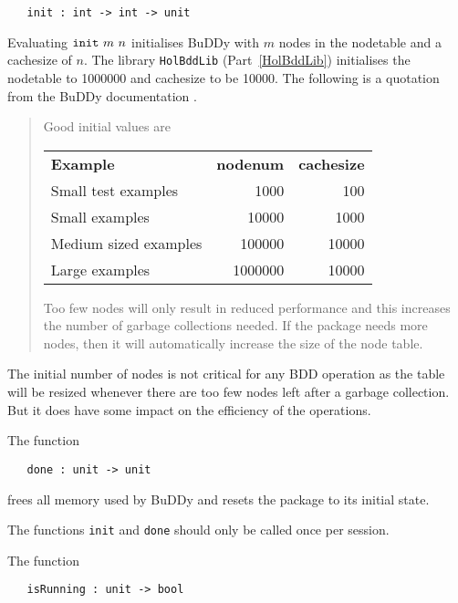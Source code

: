 \documentclass[12pt]{article}
\newcommand{\bnind}[1]{\index[MLbn]{\texttt{#1}}}
\renewcommand{\t}[1]{\mbox{\tt #1}}
\newcommand{\Buddy}{BuDDy\xspace}
\begin{document}
\begin{verbatim}
   init : int -> int -> unit
\end{verbatim}\bnind{init}

Evaluating $\t{init}~m~n$ initialises \Buddy{} with $m$ nodes in the
nodetable and a cachesize of $n$.  
The library \t{HolBddLib} (Part~\ref{HolBddLib}) 
initialises the nodetable to 1000000 and cachesize to
be 10000. The following is a quotation from the \Buddy{} documentation \cite{BuDDy}.

\vspace*{-2mm}

{\baselineskip8pt\begin{quote}\footnotesize
Good initial values are

\smallskip

\begin{tabular}{lrr}
{\bf Example} & {\bf nodenum} & {\bf cachesize} \\
Small test examples   & 1000    & 100\\
Small examples        & 10000   & 1000 \\
Medium sized examples & 100000  & 10000\\
Large examples        & 1000000 & 10000
\end{tabular}

\smallskip

Too few nodes will only result in reduced performance and this
increases the number of garbage collections needed. If the package
needs more nodes, then it will automatically increase the size of the
node table.
\end{quote}}

The initial number of nodes is not critical for any BDD operation
as the table will be resized whenever there are too few nodes left
after a garbage collection.  But it does have some impact on the
efficiency of the operations.

The function

\begin{verbatim}
   done : unit -> unit
\end{verbatim}\bnind{done}

frees all memory used by \Buddy{} and resets the
package to its initial state. 

The functions \t{init} and \t{done} should only be called once per session.

The function

\begin{verbatim}
   isRunning : unit -> bool
\end{verbatim}\bnind{isRunning}
\end{document}
